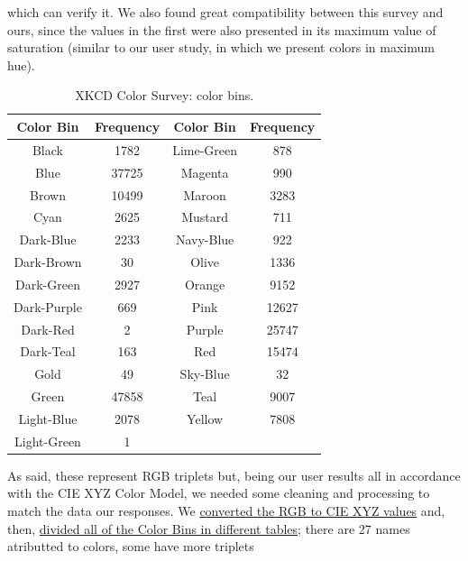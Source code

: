 which can verify it. We also found great compatibility between this survey and ours, since the values in the first were also presented in its maximum value of saturation (similar to our user study, in which we present colors in maximum hue).
%
\begin{table}[!htbp]
  \begin{center}
    \begin{tabular} {| c | c || c | c |}
      \hline
      Color Bin   &   Frequency   &   Color Bin   &   Frequency \\ \hline \hline
      Black       &   1782        &   Lime-Green  &   878 \\ \hline
      Blue        &   37725       &   Magenta     &   990 \\ \hline
      Brown       &   10499       &   Maroon      &   3283\\ \hline
      Cyan        &   2625        &   Mustard     &   711 \\ \hline
      Dark-Blue   &   2233        &   Navy-Blue   &   922 \\ \hline
      Dark-Brown  &   30          &   Olive       &   1336 \\ \hline
      Dark-Green  &   2927        &   Orange      &   9152 \\ \hline
      Dark-Purple &   669         &   Pink        &   12627 \\ \hline
      Dark-Red    &   2           &   Purple      &   25747 \\ \hline
      Dark-Teal   &   163         &   Red         &   15474 \\ \hline
      Gold        &   49          &   Sky-Blue    &   32 \\ \hline
      Green       &   47858       &   Teal        &   9007 \\ \hline
      Light-Blue  &   2078        &   Yellow      &   7808 \\ \hline
      Light-Green &   1           &   \-          &   \- \\
      \hline
    \end{tabular}
  \end{center}
  \caption[XKCD Color Survey: Color Bins]{XKCD Color Survey: color bins.}
  \label{table:colorbins}
\end{table} \par
%
As said, these represent \gls{RGB} triplets but, being our user results all in accordance with the CIE XYZ Color Model, we needed some cleaning and processing to match the data our
responses. We \ul{converted the RGB to CIE XYZ values} and, then, \ul{divided all of the Color Bins in different tables}; there are 27 names atributted to colors, some have more triplets
